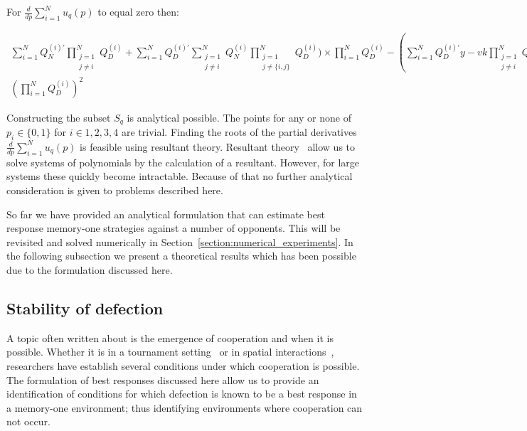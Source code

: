 \documentclass[10pt]{article}
\begin{document}
For \(\frac{d}{dp} \sum\limits_{i=1} ^ N  u_q(p)\) to equal zero then:

{\scriptsize
\begin{align*}
    \sum\limits_{i=1} ^ {N} Q_{N}^{(i)'} \prod_{\substack{j=1 \\ j \neq i}} ^ N Q_{D}^{(i)}
    + \sum\limits_{i=1} ^ {N} Q_{D}^{(i)'} \sum_{\substack{j=1 \\ j \neq i}} ^ {N} Q_{N}^{(i)}
   \prod_{\substack{j=1 \\ j \neq \{i, j\}}} ^ N Q_{D}^{(i)}) \times
   \prod\limits_{i=1} ^ N Q_{D}^{(i)} - (\sum\limits_{i=1} ^ {N} Q_{D}^{(i)'}y-vk
   \prod_{\substack{j=1 \\ j \neq i}} ^ N Q_{D}^{(i)}) \times
   (\sum\limits_{i=1} ^ {N} Q_{N}^{(i)} \prod_{\substack{j=1 \\ j \neq i}} ^ N Q_{D}^{(i)} &= 0, \quad {while} \\
   (\prod\limits_{i=1} ^ N Q_{D}^{(i)})^{2} &\neq 0.
\end{align*}}

Constructing the subset \(S_q\) is analytical possible. The points for any or
none of \(p_i \in \{0, 1\}\) for \(i \in {1, 2, 3, 4}\) are trivial. Finding the
roots of the partial derivatives \(\frac{d}{dp} \sum\limits_{i=1} ^ N  u_q(p)\)
is feasible using resultant theory. Resultant theory~\cite{Jonsson2005} allow us
to solve systems of polynomials by the calculation of a resultant. However, for
large systems these quickly become intractable. Because of that no further
analytical consideration is given to problems described here.

So far we have provided an analytical formulation that can estimate best
response memory-one strategies against a number of opponents. This will be
revisited and solved numerically in
Section~\ref{section:numerical_experiments}. In the following subsection we
present a theoretical results which has been possible due to the formulation
discussed here.

\subsection{Stability of defection}

A topic often written about is the emergence of cooperation and when it is
possible. Whether it is in a tournament setting~\cite{Axelrod1981} or in spatial
interactions~\cite{ohtsuki2006}, researchers
have establish several conditions under which cooperation is possible.
The formulation of best responses discussed here allow us to 
provide an identification of conditions for which defection is known to be a best
response in a memory-one environment; thus identifying environments where cooperation
can not occur.
\end{document}
